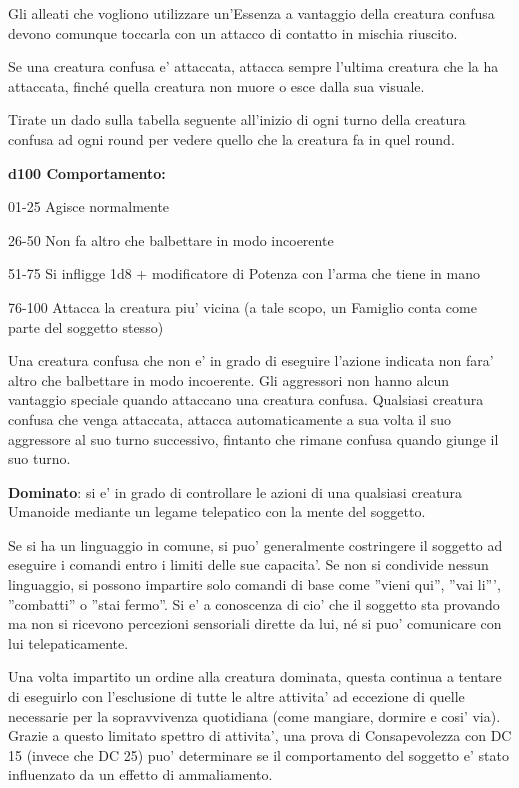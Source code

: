 \documentclass[a4paper,11pt,twoside,openany]{book}
\begin{document}
Gli alleati che vogliono utilizzare un'Essenza a vantaggio della creatura confusa devono comunque toccarla con un attacco di contatto in mischia riuscito.

Se una creatura confusa e' attaccata, attacca sempre l'ultima creatura che la ha attaccata, finché quella creatura non muore o esce dalla sua visuale.

Tirate un dado sulla tabella seguente all'inizio di ogni turno della
creatura confusa ad ogni round per vedere quello che la creatura fa
in quel round.

\textbf{d100 Comportamento:}

01-25 Agisce normalmente

26-50 Non fa altro che balbettare in modo incoerente

51-75 Si infligge 1d8 + modificatore di Potenza con l'arma che tiene in mano

76-100 Attacca la creatura piu' vicina (a tale scopo, un Famiglio conta come parte del soggetto stesso)

Una creatura confusa che non e' in grado di eseguire l'azione indicata non fara' altro che balbettare in modo incoerente. Gli aggressori non hanno alcun vantaggio speciale quando attaccano una creatura confusa. Qualsiasi creatura confusa che venga attaccata, attacca automaticamente a sua volta il suo aggressore al suo turno successivo, fintanto che rimane confusa quando giunge il suo turno.

\textbf{Dominato}: si e' in grado di controllare le azioni di una qualsiasi creatura Umanoide mediante un legame telepatico con la mente del soggetto.

Se si ha un linguaggio in comune, si puo' generalmente costringere il soggetto ad eseguire i comandi entro i limiti delle sue capacita'. Se non si condivide nessun linguaggio, si possono impartire solo comandi di base come ''vieni qui'', ''vai li''', ''combatti'' o ''stai fermo''. Si e' a conoscenza di cio' che il soggetto sta provando ma non si ricevono percezioni sensoriali dirette da lui, né si puo' comunicare con lui telepaticamente.

Una volta impartito un ordine alla creatura dominata, questa continua a tentare di eseguirlo con l'esclusione di tutte le altre attivita' ad eccezione di quelle necessarie per la sopravvivenza quotidiana (come mangiare, dormire e cosi' via). Grazie a questo limitato spettro di attivita', una prova di Consapevolezza con DC 15 (invece che DC 25) puo' determinare se il comportamento del soggetto e' stato influenzato da un effetto di ammaliamento.
\end{document}
